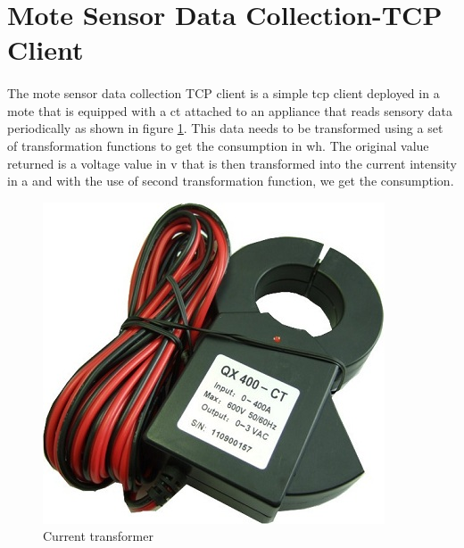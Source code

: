 \documentclass[oneside,12pt,a4paper,final]{book}
\begin{document}
\section{Mote Sensor Data Collection-TCP Client}
\paragraph{}
The mote sensor data collection TCP client is a simple \gls{tcp} client deployed in a mote that is equipped with a \gls{ct} attached to an appliance that reads sensory data periodically as shown in figure \ref{fig:current_transformer}. This data needs to be transformed using a set of transformation functions to get the consumption in \gls{wh}. The original value returned is a voltage value in \gls{v} that is then transformed into the current intensity in \gls{a} and with the use of second transformation function, we get the consumption.

\begin{figure}[htbp]
\centering
\includegraphics[scale=0.7]{img/ct.jpg}
\caption{Current transformer}
\label{fig:current_transformer}
\end{figure}
\end{document}
